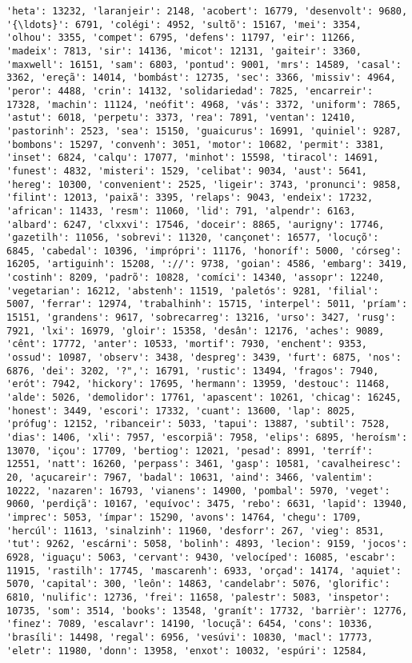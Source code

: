 \begin{Verbatim}[commandchars=\\\{\}]
'heta': 13232, 'laranjeir': 2148, 'acobert': 16779, 'desenvolt': 9680, '{\ldots}': 6791, 'colégi': 4952, 'sultõ': 15167, 'mei': 3354, 'olhou': 3355, 'compet': 6795, 'defens': 11797, 'eir': 11266, 'madeix': 7813, 'sir': 14136, 'micot': 12131, 'gaiteir': 3360, 'maxwell': 16151, 'sam': 6803, 'pontud': 9001, 'mrs': 14589, 'casal': 3362, 'ereçã': 14014, 'bombást': 12735, 'sec': 3366, 'missiv': 4964, 'peror': 4488, 'crin': 14132, 'solidariedad': 7825, 'encarreir': 17328, 'machin': 11124, 'neófit': 4968, 'vás': 3372, 'uniform': 7865, 'astut': 6018, 'perpetu': 3373, 'rea': 7891, 'ventan': 12410, 'pastorinh': 2523, 'sea': 15150, 'guaicurus': 16991, 'quiniel': 9287, 'bombons': 15297, 'convenh': 3051, 'motor': 10682, 'permit': 3381, 'inset': 6824, 'calqu': 17077, 'minhot': 15598, 'tiracol': 14691, 'funest': 4832, 'misteri': 1529, 'celibat': 9034, 'aust': 5641, 'hereg': 10300, 'convenient': 2525, 'ligeir': 3743, 'pronunci': 9858, 'filint': 12013, 'paixã': 3395, 'relaps': 9043, 'endeix': 17232, 'african': 11433, 'resm': 11060, 'lid': 791, 'alpendr': 6163, 'albard': 6247, 'clxxvi': 17546, 'doceir': 8865, 'aurigny': 17746, 'gazetilh': 11056, 'sobrevi': 11320, 'cançonet': 16577, 'locuçõ': 6845, 'cabedal': 10396, 'imprópri': 11176, 'honoríf': 5000, 'córseg': 16205, 'artiguinh': 15208, '://': 9738, 'goian': 4586, 'embarg': 3419, 'costinh': 8209, 'padrõ': 10828, 'comíci': 14340, 'assopr': 12240, 'vegetarian': 16212, 'abstenh': 11519, 'paletós': 9281, 'filial': 5007, 'ferrar': 12974, 'trabalhinh': 15715, 'interpel': 5011, 'príam': 15151, 'grandens': 9617, 'sobrecarreg': 13216, 'urso': 3427, 'rusg': 7921, 'lxi': 16979, 'gloir': 15358, 'desân': 12176, 'aches': 9089, 'cênt': 17772, 'anter': 10533, 'mortif': 7930, 'enchent': 9353, 'ossud': 10987, 'observ': 3438, 'despreg': 3439, 'furt': 6875, 'nos': 6876, 'dei': 3202, '?",': 16791, 'rustic': 13494, 'fragos': 7940, 'erót': 7942, 'hickory': 17695, 'hermann': 13959, 'destouc': 11468, 'alde': 5026, 'demolidor': 17761, 'apascent': 10261, 'chicag': 16245, 'honest': 3449, 'escori': 17332, 'cuant': 13600, 'lap': 8025, 'prófug': 12152, 'ribanceir': 5033, 'tapui': 13887, 'subtil': 7528, 'dias': 1406, 'xli': 7957, 'escorpiã': 7958, 'elips': 6895, 'heroísm': 13070, 'içou': 17709, 'bertiog': 12021, 'pesad': 8991, 'terríf': 12551, 'natt': 16260, 'perpass': 3461, 'gasp': 10581, 'cavalheiresc': 20, 'açucareir': 7967, 'badal': 10631, 'aind': 3466, 'valentim': 10222, 'nazaren': 16793, 'vianens': 14900, 'pombal': 5970, 'veget': 9060, 'perdiçã': 10167, 'equívoc': 3475, 'rebo': 6631, 'lapid': 13940, 'imprec': 5053, 'ímpar': 15290, 'avons': 14764, 'chegu': 1709, 'hercúl': 11613, 'sinalzinh': 11960, 'desforr': 267, 'vieg': 8531, 'tut': 9262, 'escárni': 5058, 'bolinh': 4893, 'lecion': 9159, 'jocos': 6928, 'iguaçu': 5063, 'cervant': 9430, 'velocíped': 16085, 'escabr': 11915, 'rastilh': 17745, 'mascarenh': 6933, 'orçad': 14174, 'aquiet': 5070, 'capital': 300, 'leôn': 14863, 'candelabr': 5076, 'glorific': 6810, 'nulific': 12736, 'frei': 11658, 'palestr': 5083, 'inspetor': 10735, 'som': 3514, 'books': 13548, 'granít': 17732, 'barrièr': 12776, 'finez': 7089, 'escalavr': 14190, 'locuçã': 6454, 'cons': 10336, 'brasíli': 14498, 'regal': 6956, 'vesúvi': 10830, 'macl': 17773, 'eletr': 11980, 'donn': 13958, 'enxot': 10032, 'espúri': 12584, 
\end{Verbatim}
